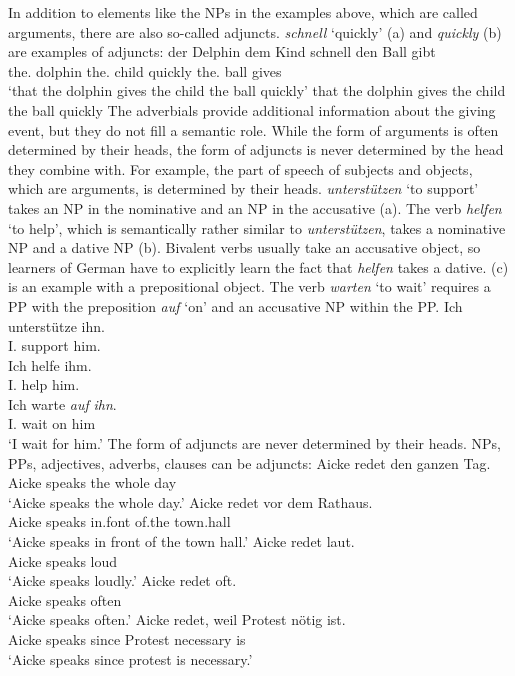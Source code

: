 In addition to elements like the NPs in the examples above, which are called arguments,
there are also so-called adjuncts. \emph{schnell} `quickly' (a) and \emph{quickly} (b)
are examples of adjuncts:
\eal
\ex
\gll \dass{} der        Delphin dem        Kind  schnell den        Ball gibt\\
     \that{} the.\NOM{} dolphin the.\DAT{} child quickly the.\ACC{} ball gives\\
\glt `that the dolphin gives the child the ball quickly'
\ex that the dolphin gives the child the ball quickly
\zl
The adverbials provide additional information about the giving event, but they do not fill a
semantic role. While the form of arguments is often determined by their
heads, the form of adjuncts is never determined by the head they combine with. For example, the part
of speech of subjects and objects, which are arguments, is determined by their
heads. \emph{unterstützen} `to support' takes an NP in the nominative and an NP in the
accusative (a). The verb \emph{helfen} `to help', which is semantically rather similar to
\emph{unterstützen}, takes a nominative NP and a dative NP (b). Bivalent verbs usually take an accusative
object, so learners of German have to explicitly learn the fact that \emph{helfen} takes a
dative. (c) is an example with a prepositional object. The verb \emph{warten} `to wait'
requires a PP with the preposition \emph{auf} `on' and an accusative NP within the PP.
\eal
\ex 
\gll Ich unterstütze  ihn.\\
     I.\NOM{} support him.\ACC\\\german
\ex 
\gll Ich helfe ihm.\\
     I.\NOM{} help him.\DAT\\
\ex 
\gll Ich warte \emph{auf} \emph{ihn}.\\
     I.\NOM{} wait on him\\
\glt `I wait for him.'
\zl
The form of adjuncts are never determined by their heads. NPs, PPs, adjectives, adverbs, clauses can
be adjuncts:
\eal
\ex 
\gll Aicke redet den ganzen Tag.\\
     Aicke speaks the whole day\\\german
\glt `Aicke speaks the whole day.'
\ex 
\gll Aicke redet vor dem Rathaus.\\
     Aicke speaks in.font of.the town.hall\\
\glt `Aicke speaks in front of the town hall.'
\ex 
\gll Aicke redet laut.\\
     Aicke speaks loud\\
\glt `Aicke speaks loudly.'
\ex 
\gll Aicke redet oft.\\
     Aicke speaks often\\
\glt `Aicke speaks often.'
\ex 
\gll Aicke redet, weil Protest nötig ist.\\
     Aicke speaks since Protest necessary is\\
\glt `Aicke speaks since protest is necessary.' 
\zl


